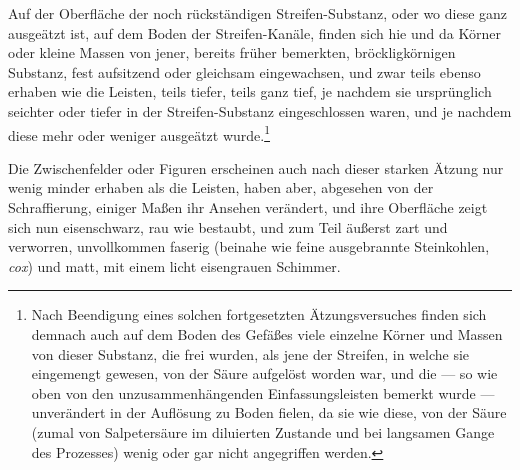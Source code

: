 \documentclass[a4paper, 11pt, oneside, german]{article}
\begin{document}
Auf der Oberfläche der noch rückständigen Streifen-Substanz, oder wo diese ganz ausgeätzt ist, auf dem Boden der Streifen-Kanäle, finden sich hie und da Körner oder kleine Massen von jener, bereits früher bemerkten, bröckligkörnigen Substanz, fest aufsitzend oder gleichsam eingewachsen, und zwar teils ebenso erhaben wie die Leisten, teils tiefer, teils ganz tief, je nachdem sie ursprünglich seichter oder tiefer in der Streifen-Substanz eingeschlossen waren, und je nachdem diese mehr oder weniger ausgeätzt wurde.\footnote{Nach Beendigung eines solchen fortgesetzten Ätzungsversuches finden sich demnach auch auf dem Boden des Gefäßes viele einzelne Körner und Massen von dieser Substanz, die frei wurden, als jene der Streifen, in welche sie eingemengt gewesen, von der Säure aufgelöst worden war, und die --- so wie oben von den unzusammenhängenden Einfassungsleisten bemerkt wurde --- unverändert in der Auflösung zu Boden fielen, da sie wie diese, von der Säure (zumal von Salpetersäure im diluierten Zustande und bei langsamen Gange des Prozesses) wenig oder gar nicht angegriffen werden.}

Die Zwischenfelder oder Figuren erscheinen auch nach dieser starken Ätzung nur wenig minder erhaben als die Leisten, haben aber, abgesehen von der Schraffierung, einiger Maßen ihr Ansehen verändert, und ihre Oberfläche zeigt sich nun eisenschwarz, rau wie bestaubt, und zum Teil äußerst zart und verworren, unvollkommen faserig (beinahe wie feine ausgebrannte Steinkohlen, \emph{cox}) und matt, mit einem licht eisengrauen Schimmer.
\end{document}
